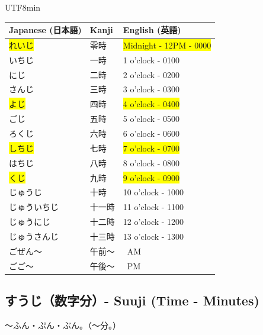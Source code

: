 \documentclass[11pt]{article}
\begin{document}
\begin{CJK}{UTF8}{min}
\begin{tabularx}{\textwidth}{X | X | X}
    \toprule
    \textbf{Japanese (日本語)} & \textbf{Kanji} & \textbf{English (英語)} \\
    \midrule
    \colorbox{yellow}{れいじ} & 零時 & \colorbox{yellow}{Midnight - 12PM - 0000} \\
    いちじ & 一時 & 1 o'clock - 0100 \\
    にじ & 二時 & 2 o'clock - 0200 \\
    さんじ & 三時 & 3 o'clock - 0300 \\
    \colorbox{yellow}{よじ} & 四時 & \colorbox{yellow}{4 o'clock - 0400} \\
    ごじ & 五時 & 5 o'clock - 0500 \\
    ろくじ & 六時 & 6 o'clock - 0600 \\
    \colorbox{yellow}{しちじ} & 七時 & \colorbox{yellow}{7 o'clock - 0700} \\
    はちじ & 八時 & 8 o'clock - 0800 \\
    \colorbox{yellow}{くじ} & 九時 & \colorbox{yellow}{9 o'clock - 0900} \\
    じゅうじ & 十時 & 10 o'clock - 1000 \\
    じゅういちじ & 十一時 & 11 o'clock - 1100 \\
    じゅうにじ & 十二時 & 12 o'clock - 1200 \\
    じゅうさんじ & 十三時 & 13 o'clock - 1300 \\
    ごぜん〜 & 午前〜 & ~AM \\
    ごご〜 & 午後〜 & ~PM \\
    \bottomrule
\end{tabularx}

\newpage
\subsection{すうじ（数字分）- Suuji (Time - Minutes)}
〜ふん・ぷん・ぶん。（〜分。）

\vspace{5pt}


\end{CJK}
\end{document}
